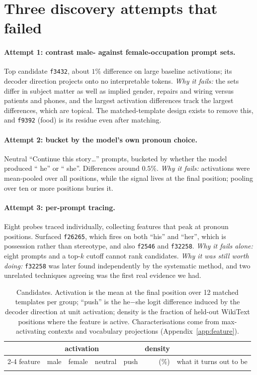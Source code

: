 \documentclass{article}
\newcommand{\ff}[1]{\texttt{f#1}}
\begin{document}
\section{Three discovery attempts that failed}\label{app:failures}

\paragraph{Attempt 1: contrast male- against female-occupation prompt sets.} Top candidate
\ff{3432}, about $1\%$ difference on large baseline activations; its decoder direction
projects onto no interpretable tokens. \emph{Why it fails:} the sets differ in subject
matter as well as implied gender, repairs and wiring versus patients and phones, and the
largest activation differences track the largest differences, which are topical. The
matched-template design exists to remove this, and \ff{9392} (food) is its residue even
after matching.

\paragraph{Attempt 2: bucket by the model's own pronoun choice.} Neutral ``Continue this
story\dots'' prompts, bucketed by whether the model produced `` he'' or `` she''.
Differences around $0.5\%$. \emph{Why it fails:} activations were mean-pooled over all
positions, while the signal lives at the final position; pooling over ten or more
positions buries it.

\paragraph{Attempt 3: per-prompt tracing.} Eight probes traced individually, collecting
features that peak at pronoun positions. Surfaced \ff{26265}, which fires on both ``his''
and ``her'', which is possession rather than stereotype, and also \ff{2546} and
\ff{32258}. \emph{Why
it fails alone:} eight prompts and a top-$k$ cutoff cannot rank candidates. \emph{Why it
was still worth doing:} \ff{32258} was later found independently by the systematic method,
and two unrelated techniques agreeing was the first real evidence we had.

\begin{table}[h]
\centering
\caption{Candidates. Activation is the mean at the final position over 12 matched
templates per group; ``push'' is the he$-$she logit difference induced by the decoder
direction at unit activation; density is the fraction of held-out WikiText positions
where the feature is active. Characterisations come from max-activating contexts and
vocabulary projections (Appendix~\ref{app:feature}).}
\label{tab:candidates}
\small
\begin{tabular}{lrrrrrl}
\toprule
& \multicolumn{3}{c}{activation} & & density & \\
\cmidrule(lr){2-4}
feature & male & female & neutral & push & (\%) & what it turns out to be \\
\midrule
 \\
\bottomrule
\end{tabular}
\end{table}
\end{document}
